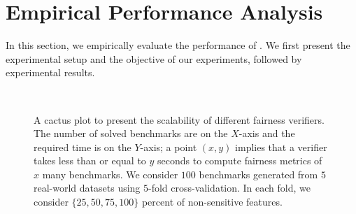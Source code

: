 \section{Empirical Performance Analysis}
\label{fvgm_sec:experiments}
In this section, we empirically evaluate the performance of {\fvgm}. We first present the experimental setup and the objective of our experiments, followed by experimental results.

\begin{figure}[t!]
	\begin{center}		
		\\
	\end{center}
	\caption{A cactus plot to present the scalability of different fairness verifiers. The number of solved benchmarks are on the $ X $-axis and the required time is on the $ Y $-axis; a point $ (x,y) $ implies that a verifier takes less than or equal to $ y $ seconds to compute fairness metrics of $ x $ many benchmarks. We consider $ 100 $ benchmarks generated from $ 5 $ real-world datasets using $ 5 $-fold cross-validation. In each fold, we consider $\{25, 50, 75, 100\} $ percent of non-sensitive features.}\label{fvgm_fig:scalability_exp}
\end{figure}

